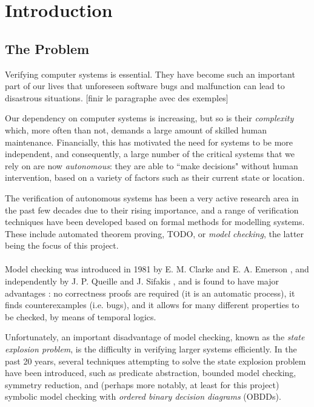 \documentclass[11pt]{article}
\begin{document}
\tableofcontents
\clearpage
\begin{abstract}

\end{abstract}

\section{Introduction}

\subsection{The Problem}

Verifying computer systems is essential. They have become such an important part of our lives that unforeseen software bugs and malfunction can lead to disastrous situations. [finir le paragraphe avec des exemples] 

Our dependency on computer systems is increasing, but so is their \textit{complexity} which, more often than not, demands a large amount of skilled human maintenance. Financially, this has motivated the need for systems to be more independent, and consequently, a large number of the critical systems that we rely on are now \textit{autonomous}: they are able to ``make decisions" without human intervention, based on a variety of factors such as their current state or location. 

The verification of autonomous systems has been a very active research area in the past few decades due to their rising importance, and a range of verification techniques have been developed based on formal methods for modelling systems. These include automated theorem proving, TODO, or \textit{model checking}, the latter being the focus of this project.
\\\\

 Model checking was introduced in 1981 by E. M. Clarke and E. A. Emerson \cite{original_model_checking}, and independently by J. P. Queille and J. Sifakis \cite{symbolic_model_checking}, and is found to have major advantages \cite{birth_of_model_checking}: no correctness proofs are required (it is an automatic process), it finds counterexamples (i.e. bugs), and it allows for many different properties to be checked, by means of temporal logics. 
 
Unfortunately, an important disadvantage of model checking, known as the \textit{state explosion problem}, is the difficulty in verifying larger systems efficiently. In the past 20 years, several techniques attempting to solve the state explosion problem have been introduced, such as predicate abstraction, bounded model checking, symmetry reduction, and (perhaps more notably, at least for this project) symbolic model checking with \textit{ordered binary decision diagrams} (OBDDs).
\end{document}
